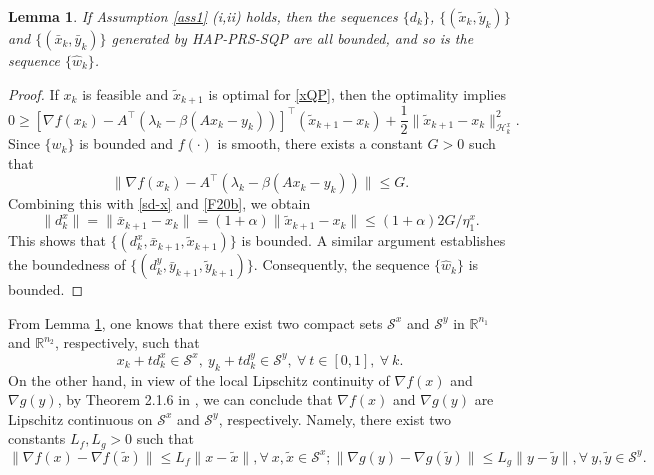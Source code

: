 \documentclass[pdflatex,sn-mathphys-num]{sn-jnl}%
\theoremstyle{thmstyleone}%
\newtheorem{lemma}{Lemma}
\theoremstyle{thmstyletwo}%
\theoremstyle{thmstylethree}%
\begin{document}
\begin{lemma}\label{lemNA}
	If Assumption \ref{ass1} (i,ii) holds, then the sequences $\{d_k\}$, $\{(\tilde{x}_k,\tilde{y}_k)\}$ and $\{(\bar{x}_k,\bar{y}_k)\}$ generated by HAP-PRS-SQP are all bounded, and so is the sequence $\{\hat{w}_k\}$.
\end{lemma}
\begin{proof}
	If $x_k$ is feasible and $\tilde{x}_{k+1}$ is optimal for \eqref{xQP}, then the optimality  implies
	\[
	0\geq[\nabla f(x_{k})-A^{\top}(\lambda_{k}-\beta(A x_{k}-y_{k}))]^{\top}(\tilde{x}_{k+1}-x_{k})+\frac{1}{2}\|\tilde{x}_{k+1}-x_{k}\|_{\mathcal{H}_k^x}^{2}.
	\]
	Since $\{w_k\}$ is bounded and $f(\cdot)$ is smooth, there exists a constant $G > 0$ such that
	\[\|\nabla f(x_{k})-A^{\top}(\lambda_{k}-\beta(A x_{k}-y_{k}))\|\leq G.\]
	Combining this with \eqref{sd-x} and \eqref{F20b}, we obtain
	\[\|d_{k}^{x}\| = \|\bar{x}_{k+1}-x_{k}\|=(1+\alpha)\|\tilde{x}_{k+1}-x_{k}\|\leq (1+\alpha)2G/\eta^x_1.\]
	This shows that $\{(d^x_k,\bar{x}_{k+1},\tilde{x}_{k+1})\}$ is bounded. A similar argument establishes the boundedness of $\{(d^y_k,\bar{y}_{k+1},\tilde{y}_{k+1})\}$. Consequently, the sequence $\{\hat{w}_k\}$ is bounded.
\end{proof}

From Lemma \ref{lemNA}, one knows that there exist two compact sets $\mathcal{S}^x$ and $\mathcal{S}^y$ in $ \mathbb{R}^{n_1}$ and $ \mathbb{R}^{n_2}$, respectively, such that
\begin{equation}\label{NF1}
	x_k+td^x_k\in \mathcal{S}^x, \   y_k+td^y_k\in \mathcal{S}^y,\ \forall\ t\in [0,1],\ \forall\ k.
\end{equation}
On the other hand, in view of the local Lipschitz continuity of $\nabla f(x)$ and $\nabla g(y)$, by Theorem 2.1.6 in \cite{CMN19}, we can conclude that $\nabla f(x)$ and $\nabla g(y)$ are Lipschitz continuous on $\mathcal{S}^x$ and $\mathcal{S}^y$, respectively. Namely, there exist two constants $L_f,L_g>0$ such that
\begin{equation}\label{NF5}
	\|\nabla f(x)-\nabla f(\tilde{x})\|\leq L_f\|x-\tilde{x}\|,\forall\ x,\tilde{x}\in \mathcal{S}^x;
	\|\nabla g(y)-\nabla g(\tilde{y})\|\leq L_g\|y-\tilde{y}\|,\forall\ y,\tilde{y}\in \mathcal{S}^y.
\end{equation}
\end{document}
